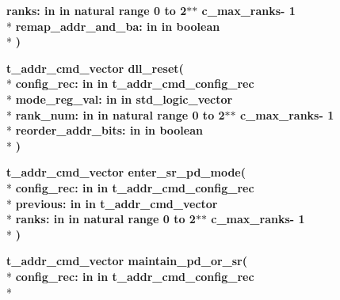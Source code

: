 \begin{DoxyCompactItemize}
{\bfseries \textcolor{vhdlchar}{ranks\+: }\textcolor{stringliteral}{in }\textcolor{vhdlchar}{in natural   range  0 to  2$\ast$$\ast$   c\+\_\+max\+\_\+ranks-\/ 1}}\\*
{\bfseries \textcolor{vhdlchar}{remap\+\_\+addr\+\_\+and\+\_\+ba\+: }\textcolor{stringliteral}{in }\textcolor{vhdlchar}{in boolean}}\\*
{\bfseries  )} 
\item 
{\bfseries {\bfseries {\bfseries {\bf t\+\_\+addr\+\_\+cmd\+\_\+vector}} \textcolor{vhdlchar}{ }}} {\bf dll\+\_\+reset}{\bfseries  ( }\\*
{\bfseries \textcolor{vhdlchar}{config\+\_\+rec\+: }\textcolor{stringliteral}{in }\textcolor{vhdlchar}{in t\+\_\+addr\+\_\+cmd\+\_\+config\+\_\+rec}}\\*
{\bfseries \textcolor{vhdlchar}{mode\+\_\+reg\+\_\+val\+: }\textcolor{stringliteral}{in }\textcolor{vhdlchar}{in std\+\_\+logic\+\_\+vector}}\\*
{\bfseries \textcolor{vhdlchar}{rank\+\_\+num\+: }\textcolor{stringliteral}{in }\textcolor{vhdlchar}{in natural   range  0 to  2$\ast$$\ast$   c\+\_\+max\+\_\+ranks-\/ 1}}\\*
{\bfseries \textcolor{vhdlchar}{reorder\+\_\+addr\+\_\+bits\+: }\textcolor{stringliteral}{in }\textcolor{vhdlchar}{in boolean}}\\*
{\bfseries  )} 
\item 
{\bfseries {\bfseries {\bfseries {\bf t\+\_\+addr\+\_\+cmd\+\_\+vector}} \textcolor{vhdlchar}{ }}} {\bf enter\+\_\+sr\+\_\+pd\+\_\+mode}{\bfseries  ( }\\*
{\bfseries \textcolor{vhdlchar}{config\+\_\+rec\+: }\textcolor{stringliteral}{in }\textcolor{vhdlchar}{in t\+\_\+addr\+\_\+cmd\+\_\+config\+\_\+rec}}\\*
{\bfseries \textcolor{vhdlchar}{previous\+: }\textcolor{stringliteral}{in }\textcolor{vhdlchar}{in t\+\_\+addr\+\_\+cmd\+\_\+vector}}\\*
{\bfseries \textcolor{vhdlchar}{ranks\+: }\textcolor{stringliteral}{in }\textcolor{vhdlchar}{in natural   range  0 to  2$\ast$$\ast$   c\+\_\+max\+\_\+ranks-\/ 1}}\\*
{\bfseries  )} 
\item 
{\bfseries {\bfseries {\bfseries {\bf t\+\_\+addr\+\_\+cmd\+\_\+vector}} \textcolor{vhdlchar}{ }}} {\bf maintain\+\_\+pd\+\_\+or\+\_\+sr}{\bfseries  ( }\\*
{\bfseries \textcolor{vhdlchar}{config\+\_\+rec\+: }\textcolor{stringliteral}{in }\textcolor{vhdlchar}{in t\+\_\+addr\+\_\+cmd\+\_\+config\+\_\+rec}}\\*

\end{DoxyCompactItemize}
